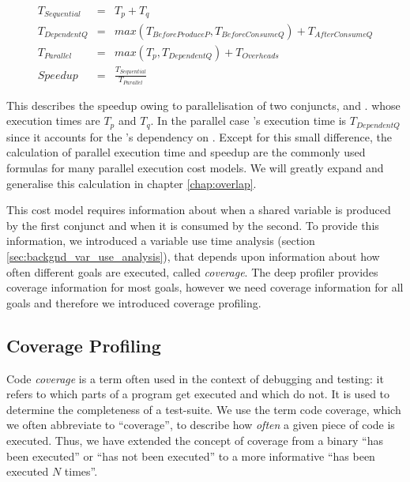 
\begin{eqnarray*}
T_{Sequential} & = & T_p + T_q \\
T_{DependentQ} & = & max(T_{BeforeProduceP}, T_{BeforeConsumeQ}) +
T_{AfterConsumeQ} \\
T_{Parallel} & = & max(T_p, T_{DependentQ}) + T_{Overheads} \\
Speedup & = & \frac{T_{Sequential}}{T_{Parallel}}
\end{eqnarray*}

This describes the speedup owing to parallelisation of two conjuncts,
and .
whose execution times are $T_p$ and $T_q$.
In the parallel case 's execution time is $T_{DependentQ}$ since it
accounts for the 's dependency on .
Except for this small difference,
the calculation of parallel execution time and speedup are the commonly
used formulas for many parallel execution cost models.
We will greatly expand and generalise this calculation in chapter
\ref{chap:overlap}.

This cost model requires information about when a shared variable is
produced by the first conjunct and when it is consumed by the second.
To provide this information,
we introduced a variable use time analysis
(section \ref{sec:backgnd_var_use_analysis}),
that depends upon information about how often different goals are executed,
called \emph{coverage}.
The deep profiler provides coverage information for most goals,
however we need coverage information for all goals
and therefore we introduced coverage profiling.

\subsection{Coverage Profiling}
\label{sec:backgnd_coverage}


Code \emph{coverage} is a term often used in the context of debugging and
testing:
it refers to which parts of a program get executed and which do not.
It is used to determine the completeness of a test-suite.
We use the term code coverage,
which we often abbreviate to ``coverage'',
to describe how \emph{often} a given piece of code is executed.
Thus, we have extended the concept of coverage from a binary ``has been
executed'' or ``has not been executed'' to a more informative
``has been executed $N$ times''.

